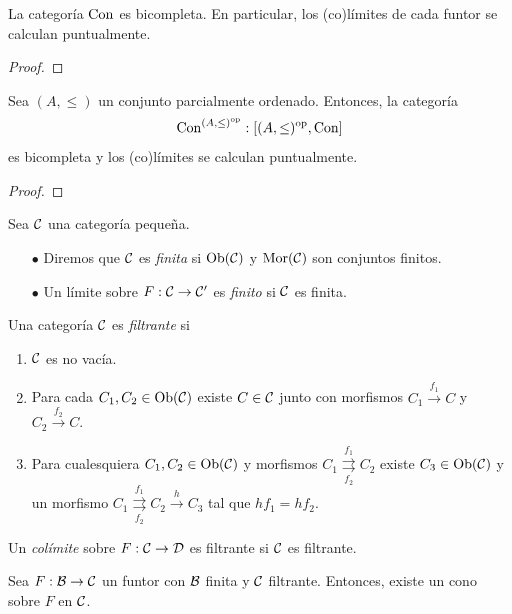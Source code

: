 \begin{lema}
    La categoría ${\mathrm{Con}}$ es bicompleta. En particular, los (co)límites de cada funtor se calculan puntualmente.
\end{lema}
\begin{proof}
\end{proof}

\begin{lema}
    Sea $(A,\leq)$ un conjunto parcialmente ordenado. Entonces, la categoría \begin{equation*}
    {\mathrm{Con}}^{(A,\leq)^{{\mathrm{op}}}}:[(A,\leq)^{{\mathrm{op}}},{\mathrm{Con}}]    
    \end{equation*} 
    es bicompleta y los (co)límites se calculan puntualmente.
\end{lema}
\begin{proof}
\end{proof}
\begin{definition}
    Sea ${\mathcal C}$ una categoría pequeña.
    \begin{enumerate}
        \item[$\bullet$] Diremos que ${\mathcal C}$ es \emph{finita} si $\operatorname{Ob}({\mathcal C})$ y ${\mathrm{Mor}}({\mathcal C})$ son conjuntos finitos.
        \item[$\bullet$] Un límite sobre $F:{\mathcal C}\to {\mathcal C}'$ es \emph{finito} si ${\mathcal C}$ es finita. 
    \end{enumerate}
\end{definition}
\begin{definition}
    Una categoría ${\mathcal C}$ es \emph{filtrante} si
    \begin{enumerate}
        \item ${\mathcal C}$ es no vacía.
        \item Para cada $C_1, C_2\in \operatorname{Ob}({\mathcal C})$ existe $C\in {\mathcal C}$ junto con morfismos $C_1\xrightarrow{f_1} C$ y $C_2\xrightarrow{f_2} C$.
        \item Para cualesquiera $C_1,C_2\in \operatorname{Ob}({\mathcal C})$ y morfismos $C_1 \overset{f_1}{\underset{f_2}{\rightrightarrows}} C_2$ existe $C_3\in\operatorname{Ob}({\mathcal C})$ y un morfismo $C_1 \overset{f_1}{\underset{f_2}{\rightrightarrows}} C_2\xrightarrow{h} C_3$ tal que $hf_1=hf_2$.
    \end{enumerate}
\end{definition}
\begin{definition}
    Un \emph{colímite} sobre $F:{\mathcal C}\to{\mathcal D}$ es filtrante si ${\mathcal C}$ es filtrante.
\end{definition}
\begin{lema}
    Sea $F:{\mathcal B}\to{\mathcal C}$ un funtor con ${\mathcal B}$ finita y ${\mathcal C}$ filtrante. Entonces, existe un cono sobre $F$ en ${\mathcal C}$.
\end{lema}
